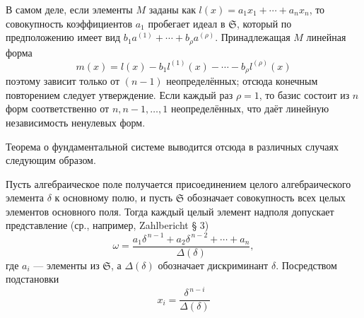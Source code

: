\documentclass[11pt]{article}
\providecommand{\frS}{\mathfrak S}
\begin{document}
В самом деле, если элементы \(M\) заданы как \(l(x)=a_1x_1+\cdots+a_nx_n\), то совокупность коэффициентов \(a_1\) пробегает идеал в \(\frS\), который по предположению имеет вид \(b_1a^{(1)}+\cdots+b_\rho a^{(\rho)}\). Принадлежащая \(M\) линейная форма
\[
m(x)=l(x)-b_1l^{(1)}(x)-\cdots-b_\rho l^{(\rho)}(x)
\]
поэтому зависит только от \((n-1)\) неопределённых; отсюда конечным повторением следует утверждение. Если каждый раз \(\rho=1\), то базис состоит из \(n\) форм соответственно от \(n,n-1,\ldots,1\) неопределённых, что даёт линейную независимость ненулевых форм.

Теорема о фундаментальной системе выводится отсюда в различных случаях следующим образом.

Пусть алгебраическое поле получается присоединением целого алгебраического элемента \(\delta\) к основному полю, и пусть \(\frS\) обозначает совокупность всех целых элементов основного поля. Тогда каждый целый элемент надполя допускает представление (ср., например, Zahlbericht § 3)
\[
\omega=\frac{a_1\delta^{\,n-1}+a_2\delta^{\,n-2}+\cdots+a_n}{\Delta(\delta)},
\]
где \(a_i\) --- элементы из \(\frS\), а \(\Delta(\delta)\) обозначает дискриминант \(\delta\). Посредством подстановки
\[
x_i=\frac{\delta^{\,n-i}}{\Delta(\delta)}
\]
\end{document}
